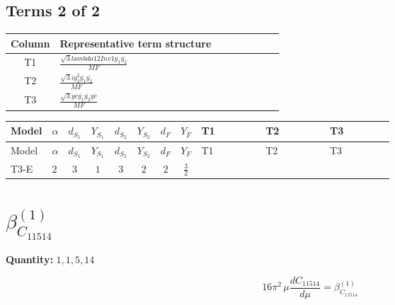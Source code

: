 \documentclass[8pt]{article}
\begin{document}
\begin{landscape}
\subsection*{Terms 2 of 2}
\begin{center}
\begin{tabular}{@{}c >{\raggedright\arraybackslash}p{0.82\linewidth}@{}}
\toprule
Column & Representative term structure \\
\midrule
T1 & \(\displaystyle \frac{\sqrt{3} lambda12Inv1 \overline{y_{1}} \overline{y_{2}}}{MF}\) \\
\midrule
T2 & \(\displaystyle \frac{\sqrt{3} i g_{2}^{2} \overline{y_{1}} \overline{y_{2}}}{MF}\) \\
\midrule
T3 & \(\displaystyle \frac{\sqrt{3} ye \overline{y_{1}} \overline{y_{2}} \overline{ye}}{MF}\) \\
\midrule
\bottomrule
\end{tabular}
\end{center}
\smallskip
\tiny
\begin{longtable}{@{}llcccccc >{\raggedright\arraybackslash}p{0.21\linewidth} >{\raggedright\arraybackslash}p{0.21\linewidth} >{\raggedright\arraybackslash}p{0.21\linewidth}@{}}
\toprule
Model & $\alpha$ & $d_{S_1}$ & $Y_{S_1}$ & $d_{S_2}$ & $Y_{S_2}$ & $d_F$ & $Y_F$ & T1 & T2 & T3 \\
\midrule
\endfirsthead
\toprule
Model & $\alpha$ & $d_{S_1}$ & $Y_{S_1}$ & $d_{S_2}$ & $Y_{S_2}$ & $d_F$ & $Y_F$ & T1 & T2 & T3 \\
\midrule
\endhead
T3-E & $2$ & $3$ & $1$ & $3$ & $2$ & $2$ & $\frac{3}{2}$ & \scriptsize\adjustbox{max width=\linewidth}{$\begin{gathered} \frac{\sqrt{3} lambda12Inv1 \overline{y_{1}} \overline{y_{2}}}{6 MF}\end{gathered}$} & \scriptsize\adjustbox{max width=\linewidth}{$\begin{gathered} - \frac{\sqrt{3} i g_{2}^{2} \overline{y_{1}} \overline{y_{2}}}{6 MF}\end{gathered}$} & \scriptsize\adjustbox{max width=\linewidth}{$\begin{gathered} \frac{\sqrt{3} ye \overline{y_{1}} \overline{y_{2}} \overline{ye}}{12 MF}\end{gathered}$} \\
\midrule
\bottomrule
\end{longtable}
\clearpage
\section*{$\beta_{C_{11514}}^{(1)}$}
\noindent\textbf{Quantity: }$\mathrm{1,1,5,14}$\par\smallskip
\[16\pi^2\,\mu\frac{d C_{11514}}{d\mu}=\beta_{C_{11514}}^{(1)}\]

\end{landscape}
\end{document}
